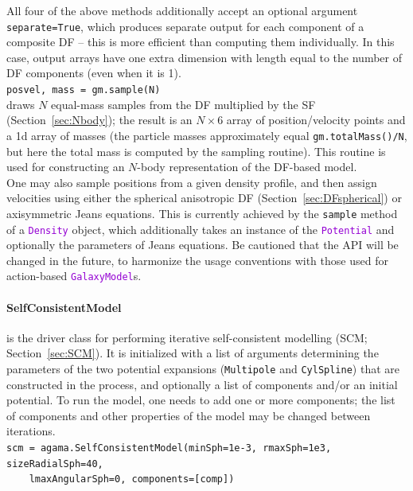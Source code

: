 \documentclass[12pt]{article}
\newcommand{\ttt}[1]{\textcolor{darkviolet}{\texttt{#1}}}
\newcommand{\ppp}[1]{\textcolor{darkolive} {\texttt{#1}}}
\begin{document}
All four of the above methods additionally accept an optional argument \texttt{separate=True}, which produces separate output for each component of a composite DF -- this is more efficient than computing them individually. In this case, output arrays have one extra dimension with length equal to the number of DF components (even when it is 1).
\\[2mm]
\texttt{posvel, mass = gm.sample(N)}\\
draws $N$ equal-mass samples from the DF multiplied by the SF (Section~\ref{sec:Nbody}); the result is an $N\times6$ array of position/velocity points and a 1d array of masses (the particle masses approximately equal \texttt{gm.totalMass()/N}, but here the total mass is computed by the sampling routine). This routine is used for constructing an $N$-body representation of the DF-based model.
\\[2mm]
One may also sample positions from a given density profile, and then assign velocities using either the spherical anisotropic DF (Section~\ref{sec:DFspherical}) or axisymmetric Jeans equations. This is currently achieved by the \texttt{sample} method of a \ttt{Density} object, which additionally takes an instance of the \ttt{Potential} and optionally the parameters of Jeans equations. Be cautioned that the API will be changed in the future, to harmonize the usage conventions with those used for action-based \ttt{GalaxyModel}s.

\paragraph{SelfConsistentModel} is the driver class for performing iterative self-consistent modelling (SCM; Section~\ref{sec:SCM}). It is initialized with a list of arguments determining the parameters of the two potential expansions (\ppp{Multipole} and \ppp{CylSpline}) that are constructed in the process, and optionally a list of components and/or an initial potential. To run the model, one needs to add one or more components; the list of components and other properties of the model may be changed between iterations.\\
\texttt{scm = agama.SelfConsistentModel(minSph=1e-3, rmaxSph=1e3, sizeRadialSph=40,\\ \mbox{}~~~~lmaxAngularSph=0, components=[comp])}
\end{document}
